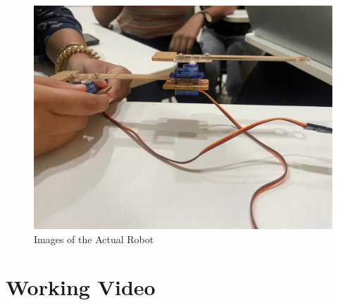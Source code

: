 \documentclass{article}
\begin{document}
\begin{figure}[h!]
    \centering
     \includegraphics[width=1\textwidth]{robo_arm.jpg}
    \caption{Images of the Actual Robot}
    \label{fig:robot-images}
\end{figure}

\section{Working Video}
\end{document}
